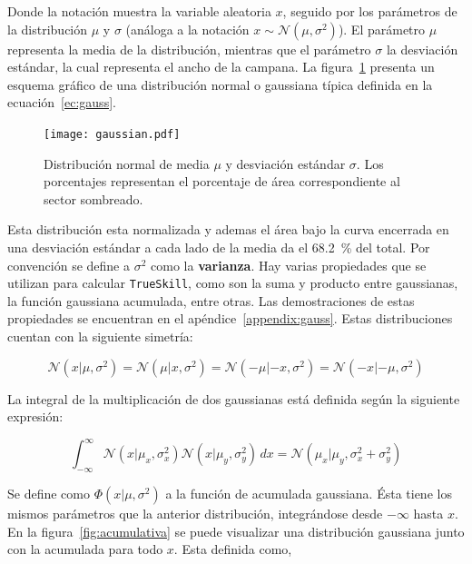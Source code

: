 \documentclass[11pt,twoside,spanish]{report} %
\begin{document}
Donde la notaci\'on muestra la variable aleatoria $x$, seguido por los par\'ametros de la distribuci\'on $\mu$ y $\sigma$ (an\'aloga a la notaci\'on $x \sim \mathcal{N}(\mu, \sigma^2)$).
El par\'ametro $\mu$ representa la media de la distribuci\'on, mientras que el par\'ametro $\sigma$ la desviaci\'on est\'andar, la cual representa el ancho de la campana.
La figura~\ref{fig:gaus} presenta un esquema gr\'afico de una distribuci\'on normal o gaussiana t\'ipica definida en la ecuaci\'on~\ref{ec:gauss}.

\begin{figure}[H]
	\centering
	\texttt{[image: gaussian.pdf]}
	\caption{Distribuci\'on normal de media $\mu$ y desviaci\'on est\'andar $\sigma$. Los porcentajes representan el porcentaje de \'area correspondiente al sector sombreado.}
	\label{fig:gaus}
\end{figure}

Esta distribuci\'on esta normalizada y ademas el \'area bajo la curva encerrada en una desviaci\'on est\'andar a cada lado de la media da el \SI{68.2}{\percent} del total.
Por convenci\'on se define a $\sigma^2$ como la \textbf{varianza}.
Hay varias propiedades que se utilizan para calcular \texttt{TrueSkill}, como son la suma y producto entre gaussianas, la funci\'on gaussiana acumulada, entre otras.
Las demostraciones de estas propiedades se encuentran en el ap\'endice~\ref{appendix:gauss}.
Estas distribuciones cuentan con la siguiente simetr\'ia:

\begin{equation}\label{eq:simetria}
\mathcal{N}(x|\mu,\sigma^2) = \mathcal{N}(\mu|x,\sigma^2) = \mathcal{N}(-\mu|-x,\sigma^2) = \mathcal{N}(-x|-\mu,\sigma^2)
\end{equation}

La integral de la multiplicaci\'on de dos gaussianas est\'a definida seg\'un la siguiente expresi\'on:

\begin{equation}\label{eq:multiplicacion_normales}
\int_{-\infty}^{\infty} \mathcal{N}(x|\mu_x,\sigma_x^2)\mathcal{N}(x|\mu_y,\sigma_y^2) \, dx = \mathcal{N}(\mu_x|\mu_y,\sigma_x^2+\sigma_y^2)
\end{equation}

Se define como $\Phi(x|\mu,\sigma^2)$ a la funci\'on de acumulada gaussiana.
\'Esta tiene los mismos par\'ametros que la anterior distribuci\'on, integr\'andose desde $-\infty$ hasta $x$.
En la figura~\ref{fig:acumulativa} se puede visualizar una distribuci\'on gaussiana junto con la acumulada para todo $x$.
Esta definida como,
\end{document}
